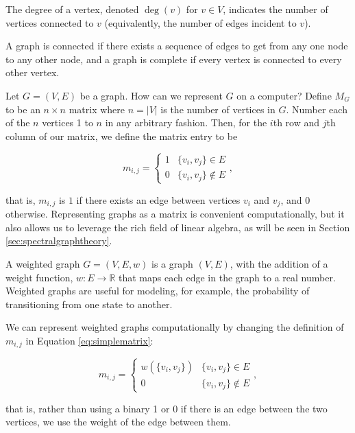 The degree of a vertex, denoted \(\deg(v)\) for \(v \in V\), indicates the number of vertices connected to \(v\) (equivalently, the number of edges incident to \(v\)).

A graph is connected if there exists a sequence of edges to get from any one node to any other node, and a graph is complete if every vertex is connected to every other vertex.

Let \(G = (V, E)\) be a graph. How can we represent \(G\) on a computer? Define \(M_{G}\) to be an \(n \times n\) matrix where \(n = |V|\) is the number of vertices in \(G\). Number each of the \(n\) vertices 1 to \(n\) in any arbitrary fashion. Then, for the \(i\)th row and \(j\)th column of our matrix, we define the matrix entry to be


\begin{equation}
	m_{i, j} = \begin{cases}
1 & \{v_{i}, v_{j}\} \in E\\
0 & \{v_{i}, v_{j}\} \not\in E
\end{cases},\label{eq:simplematrix}
\end{equation}

\noindent that is, \(m_{i, j}\) is \(1\) if there exists an edge between vertices \(v_{i}\) and \(v_{j}\), and \(0\) otherwise. Representing graphs as a matrix is convenient computationally, but it also allows us to leverage the rich field of linear algebra, as will be seen in Section \ref{sec:spectralgraphtheory}.

A weighted graph \(G = (V, E, w)\) is a graph \((V, E)\), with the addition of a weight function, \(w: E \rightarrow \mathbb{R}\) that maps each edge in the graph to a real number. Weighted graphs are useful for modeling, for example, the probability of transitioning from one state to another.

We can represent weighted graphs computationally by changing the definition of \(m_{i, j}\) in Equation \ref{eq:simplematrix}:

\begin{equation}
 m_{i, j} = \begin{cases}
w(\{v_{i}, v_{j}\}) & \{v_{i}, v_{j}\} \in E\\
0 & \{v_{i}, v_{j}\} \not\in E
\end{cases},\label{eq:weightedmatrix}
\end{equation}

\noindent that is, rather than using a binary 1 or 0 if there is an edge between the two vertices, we use the weight of the edge between them.

